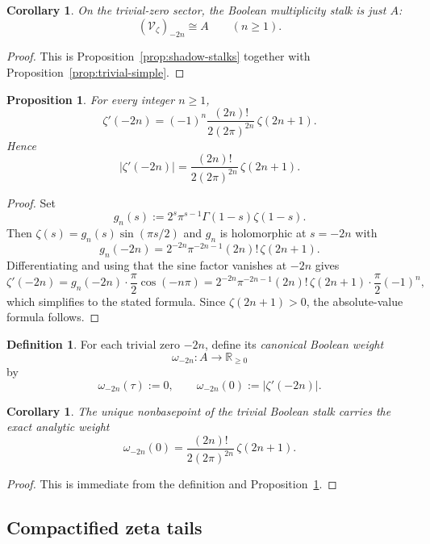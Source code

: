 \documentclass[11pt,a4paper]{article}
\newtheorem{proposition}[theorem]{Proposition}
\newtheorem{corollary}[theorem]{Corollary}
\theoremstyle{definition}
\newtheorem{definition}[theorem]{Definition}
\theoremstyle{remark}
\newcommand{\RR}{\mathbb R}
\newcommand{\cV}{\mathcal V}
\newcommand{\taup}{\tau}
\begin{document}
\begin{corollary}\label{cor:trivial-stalk}
On the trivial-zero sector, the Boolean multiplicity stalk is just $A$:
\[
(\cV_\zeta)_{-2n}\cong A\qquad(n\ge1).
\]
\end{corollary}

\begin{proof}
This is Proposition~\ref{prop:shadow-stalks} together with Proposition~\ref{prop:trivial-simple}.
\end{proof}

\begin{proposition}\label{prop:trivial-derivative}
For every integer $n\ge1$,
\[
\zeta'(-2n)=(-1)^n\frac{(2n)!}{2(2\pi)^{2n}}\,\zeta(2n+1).
\]
Hence
\[
|\zeta'(-2n)|=\frac{(2n)!}{2(2\pi)^{2n}}\,\zeta(2n+1).
\]
\end{proposition}

\begin{proof}
Set
\[
g_n(s):=2^s\pi^{s-1}\Gamma(1-s)\zeta(1-s).
\]
Then $\zeta(s)=g_n(s)\sin(\pi s/2)$ and $g_n$ is holomorphic at $s=-2n$ with
\[
g_n(-2n)=2^{-2n}\pi^{-2n-1}(2n)!\,\zeta(2n+1).
\]
Differentiating and using that the sine factor vanishes at $-2n$ gives
\[
\zeta'(-2n)=g_n(-2n)\cdot \frac\pi2\cos(-n\pi)
=2^{-2n}\pi^{-2n-1}(2n)!\,\zeta(2n+1)\cdot\frac\pi2(-1)^n,
\]
which simplifies to the stated formula.  Since $\zeta(2n+1)>0$, the absolute-value formula follows.
\end{proof}

\begin{definition}
For each trivial zero $-2n$, define its \emph{canonical Boolean weight}
\[
\omega_{-2n}:A\to\RR_{\ge0}
\]
by
\[
\omega_{-2n}(\taup):=0,
\qquad
\omega_{-2n}(0):=|\zeta'(-2n)|.
\]
\end{definition}

\begin{corollary}\label{cor:trivial-weight}
The unique nonbasepoint of the trivial Boolean stalk carries the exact analytic weight
\[
\omega_{-2n}(0)=\frac{(2n)!}{2(2\pi)^{2n}}\,\zeta(2n+1).
\]
\end{corollary}

\begin{proof}
This is immediate from the definition and Proposition~\ref{prop:trivial-derivative}.
\end{proof}

\subsection{Compactified zeta tails}
\end{document}
